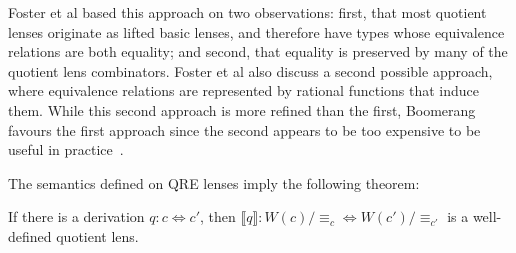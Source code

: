 \documentclass[acmsmall,review,anonymous]{acmart}
\newcommand{\eqrel}[1]{\ensuremath{\equiv_{#1}}}
\begin{document}
Foster et al based this approach on two observations: first, that most quotient
lenses originate as lifted basic lenses, and therefore have types whose
equivalence relations are both equality; and second, that equality is preserved
by many of the quotient lens combinators. Foster et al also discuss a second
possible approach, where equivalence relations are represented by rational
functions that induce them. While this second approach is more refined than the
first, Boomerang favours the first approach since the second appears to be too
expensive to be useful in practice~\cite{quotientlenses}.

The semantics defined on QRE lenses imply the following theorem:
\begin{theorem}
If there is a derivation $q : c \Leftrightarrow c'$, then $\llbracket q
\rrbracket : W(c)/{\eqrel{c}} \Leftrightarrow W(c')/{\eqrel{c'}}$ is a
well-defined quotient lens.
\end{theorem}
\end{document}
